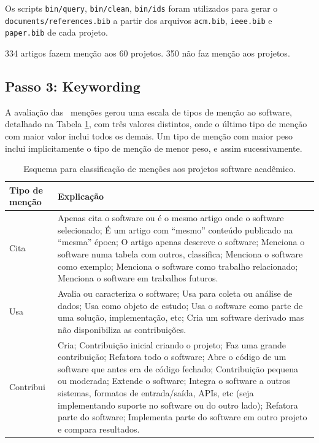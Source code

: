 Os scripts \texttt{bin/query}, \texttt{bin/clean}, \texttt{bin/ids} foram
utilizados para gerar o \texttt{documents/references.bib} a partir dos arquivos
\texttt{acm.bib}, \texttt{ieee.bib} e \texttt{paper.bib} de cada projeto.

334 artigos fazem menção aos 60 projetos.
350 não faz menção aos projetos.

\subsection{Passo 3: Keywording}

A avaliação das \ScreeningCount \ menções gerou uma escala de tipos de menção
ao software, detalhado na Tabela \ref{esquema-de-mencao}, com três valores
distintos, onde o último tipo de menção com maior valor inclui todos os demais.
Um tipo de menção com maior peso inclui implicitamente o tipo de menção de
menor peso, e assim sucessivamente.

\begin{table}[h]
\caption{Esquema para classificação de menções aos projetos software acadêmico.}
\centering
\begin{tabular}{ l p{10cm} }
  \hline
  Tipo de menção           & Explicação \\
  \hline
  Cita      & Apenas cita o software ou é o mesmo artigo onde o software selecionado; É um artigo com ``mesmo'' conteúdo publicado na ``mesma'' época; O artigo apenas descreve o software; Menciona o software numa tabela com outros, classifica; Menciona o software como exemplo; Menciona o software como trabalho relacionado; Menciona o software em trabalhos futuros. \\
  Usa       & Avalia ou caracteriza o software; Usa para coleta ou análise de dados; Usa como objeto de estudo; Usa o software como parte de uma solução, implementação, etc; Cria um software derivado mas não disponibiliza as contribuições. \\
  Contribui & Cria; Contribuição inicial criando o projeto; Faz uma grande contribuição; Refatora todo o software; Abre o código de um software que antes era de código fechado; Contribuição pequena ou moderada; Extende o software; Integra o software a outros sistemas, formatos de entrada/saída, APIs, etc (seja implementando suporte no software ou do outro lado); Refatora parte do software; Implementa parte do software em outro projeto e compara resultados. \\
  \hline
\end{tabular}
\label{esquema-de-mencao}
\end{table}

